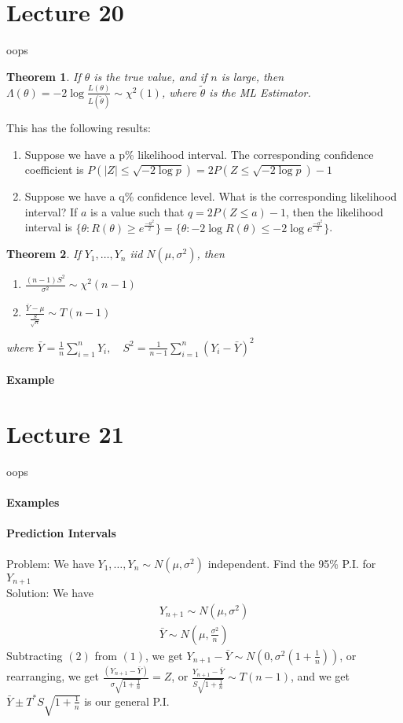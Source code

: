 \documentclass[10pt,letter]{article}
\theoremstyle{plain}
\newtheorem*{theorem*}{Theorem}
\theoremstyle{definition}
\begin{document}
\section*{Lecture 20}
oops 
\begin{theorem*}
     If $\theta$ is the true value, and if $n$ is large, then $\Lambda(\theta)=-2\log\frac{L(\theta)}{L(\tilde{\theta})}\sim\chi^2(1)$, where $\tilde{\theta}$ is the ML Estimator. 
\end{theorem*}
This has the following results: 
\begin{enumerate}
    \item Suppose we have a p\% likelihood interval. The corresponding confidence coefficient is $P(|Z|\leq\sqrt{-2\log p})=2P(Z\leq\sqrt{-2\log p})-1$ 
    \item Suppose we have a q\% confidence level. What is the corresponding likelihood interval? If $a$ is a value such that $q=2P(Z\leq a)-1$, then the likelihood interval  is $\{\theta:R(\theta)\geq e^{\frac{-a^2}{2}}\}=\{\theta:-2\log R(\theta)\leq-2\log e^{\frac{-a^2}{2}}\}$. 
\end{enumerate}
\begin{theorem*}
     If $Y_1,\ldots,Y_n$ iid $N(\mu,\sigma^2)$, then 
     \begin{enumerate}
         \item $\frac{(n-1)S^2}{\sigma^2}\sim\chi^2(n-1)$ 
         \item $\frac{\bar{Y}-\mu}{\frac{S}{\sqrt{n}}}\sim T(n-1)$
     \end{enumerate}
     where $\bar{Y}=\frac{1}{n}\sum_{i=1}^n Y_i,\quad S^2=\frac{1}{n-1}\sum_{i=1}^n(Y_i-\bar{Y})^2$
\end{theorem*}
\paragraph{Example}

\section*{Lecture 21}
oops
\paragraph{Examples}
\paragraph{Prediction Intervals}
Problem: We have $Y_1,\ldots,Y_n\sim N(\mu,\sigma^2)$ independent. Find the 95\% P.I. for $Y_{n+1}$ \\ 
Solution: We have \begin{align}Y_{n+1}\sim N(\mu,\sigma^2)\\ \bar{Y}\sim N(\mu,\frac{\sigma^2}{n})\end{align}
Subtracting $(2)$ from $(1)$, we get $Y_{n+1}-\bar{Y}\sim N\left(0,\sigma^2(1+\frac{1}{n})\right)$, or rearranging, we get $\frac{(Y_{n+1}-\bar{Y})}{\sigma\sqrt{1+\frac{1}{n}}}= Z$, or $\frac{Y_{n+1}-\bar{Y}}{S\sqrt{1+\frac{1}{n}}}\sim T(n-1)$, and we get $\bar{Y}\pm T^*S\sqrt{1+\frac{1}{n}}$ is our general P.I.
\end{document}
